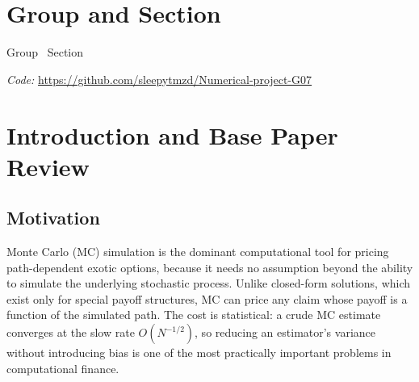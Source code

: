 \documentclass[sigconf]{acmart}
\begin{document}

\maketitle

\section*{Group and Section}
\noindent Group \groupnumber\ \quad Section \coursesection

\medskip
\noindent\textit{Code:} \url{https://github.com/sleepytmzd/Numerical-project-G07}

\section{Introduction and Base Paper Review}

\subsection{Motivation}
Monte Carlo (MC) simulation is the dominant computational tool for pricing
path-dependent exotic options, because it needs no assumption beyond the
ability to simulate the underlying stochastic process. Unlike closed-form
solutions, which exist only for special payoff structures, MC can price any
claim whose payoff is a function of the simulated path. The cost is
statistical: a crude MC estimate converges at the slow rate $O(N^{-1/2})$, so
reducing an estimator's variance without introducing bias is one of the most
practically important problems in computational finance.
\end{document}
